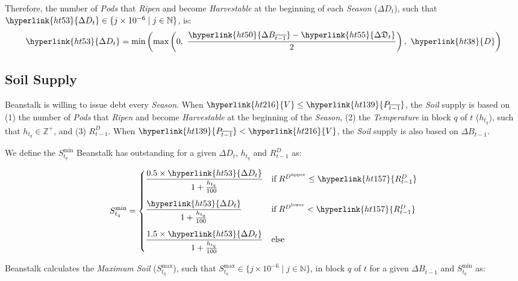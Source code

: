 \documentclass[tikz]{article}
\newcommand{\term}[1]{\textsl{#1}}
\begin{document}
Therefore, the number of \term{Pods} that \term{Ripen} and become \term{Harvestable} at the beginning of each \term{Season} (\hyperlink{ht53}{$\Delta D_t$}), such that $\hyperlink{ht53}{\Delta D_t} \in \{j \times 10^{-6} \mid j \in \mathbb{N} \}$, is:
\vspace*{1mm}
$$\hyperlink{ht53}{\Delta D_t} = \text{min}\left(\text{max}\left(0,\ \frac{\hyperlink{ht50}{\Delta B_{\overline{t-1}}} - \hyperlink{ht55}{\Delta \mathfrak{D}_t}}{2}\right),\ \hyperlink{ht38}{D}\right)$$

\subsection{Soil Supply}

Beanstalk is willing to issue debt every \term{Season}. When $\hyperlink{ht216}{V} \leq \hyperlink{ht139}{P_{\overline{t-1}}}$, the \term{Soil} supply is based on (1) the number of \term{Pods} that \term{Ripen} and become \term{Harvestable} at the beginning of the \term{Season}, (2) the \term{Temperature} in block $q$ of $t$ ($h_{t_q}$), such that $h_{t_q} \in \mathbb{Z}^{+}$, and (3) \hyperlink{ht157}{$R^D_{t-1}$}. When $\hyperlink{ht139}{P_{\overline{t-1}}} < \hyperlink{ht216}{V}$, the \term{Soil} supply is also based on \hyperlink{ht50}{$\Delta B_{\overline{t-1}}$}.

We define the $S_{t_q}^{\text{min}}$ Beanstalk has outstanding for a given \hyperlink{ht53}{$\Delta D_t$}, {$h_{t_q}$} and \hyperlink{ht157}{$R^D_{t-1}$} as:

\vspace*{2mm}

$$S_{t_q}^{\text{min}} = \begin{cases} \dfrac{0.5 \times \hyperlink{ht53}{\Delta D_t}}{1 + \frac{h_{t_q}}{100}} & \text{if} \; R^{D^{\text{upper}}} \leq \hyperlink{ht157}{R^D_{t-1}} \vspace{.3cm} \\ 
\dfrac{\hyperlink{ht53}{\Delta D_t}}{1 + \frac{h_{t_q}}{100}} & \text{if} \; R^{D^{\text{lower}}} < \hyperlink{ht157}{R^D_{t-1}} \vspace{.3cm} \\ 
\dfrac{1.5 \times \hyperlink{ht53}{\Delta D_t}}{1 + \frac{h_{t_q}}{100}} & \text{else} \end{cases}$$

\vspace*{2mm}

Beanstalk calculates the \term{Maximum Soil} ($S_{t_q}^{\text{max}}$), such that $S_{t_q}^{\text{max}} \in \{j \times 10^{-6} \mid j \in \mathbb{N} \}$, in block $q$ of $t$ for a given \hyperlink{ht50}{$\Delta B_{\overline{t-1}}$} and $S_{t_q}^{\text{min}}$ as:
\end{document}
